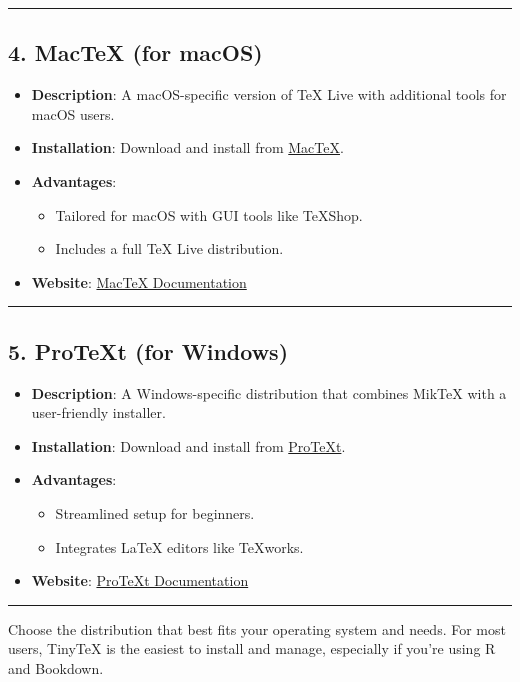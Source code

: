 \documentclass[
]{book}
\providecommand{\tightlist}{%
  \setlength{\itemsep}{0pt}\setlength{\parskip}{0pt}}
\theoremstyle{definition}
\theoremstyle{definition}
\theoremstyle{definition}
\theoremstyle{definition}
\theoremstyle{remark}
\begin{document}
\begin{center}\rule{0.5\linewidth}{0.5pt}\end{center}

\subsection{\texorpdfstring{4. \textbf{MacTeX} (for macOS)}{4. MacTeX (for macOS)}}\label{mactex-for-macos-1}

\begin{itemize}
\tightlist
\item
  \textbf{Description}: A macOS-specific version of TeX Live with additional tools for macOS users.
\item
  \textbf{Installation}: Download and install from \href{https://www.tug.org/mactex/}{MacTeX}.
\item
  \textbf{Advantages}:

  \begin{itemize}
  \tightlist
  \item
    Tailored for macOS with GUI tools like TeXShop.
  \item
    Includes a full TeX Live distribution.
  \end{itemize}
\item
  \textbf{Website}: \href{https://www.tug.org/mactex/}{MacTeX Documentation}
\end{itemize}

\begin{center}\rule{0.5\linewidth}{0.5pt}\end{center}

\subsection{\texorpdfstring{5. \textbf{ProTeXt} (for Windows)}{5. ProTeXt (for Windows)}}\label{protext-for-windows-1}

\begin{itemize}
\tightlist
\item
  \textbf{Description}: A Windows-specific distribution that combines MikTeX with a user-friendly installer.
\item
  \textbf{Installation}: Download and install from \href{https://www.tug.org/protext/}{ProTeXt}.
\item
  \textbf{Advantages}:

  \begin{itemize}
  \tightlist
  \item
    Streamlined setup for beginners.
  \item
    Integrates LaTeX editors like TeXworks.
  \end{itemize}
\item
  \textbf{Website}: \href{https://www.tug.org/protext/}{ProTeXt Documentation}
\end{itemize}

\begin{center}\rule{0.5\linewidth}{0.5pt}\end{center}

Choose the distribution that best fits your operating system and needs. For most users, TinyTeX is the easiest to install and manage, especially if you're using R and Bookdown.

  
\end{document}
